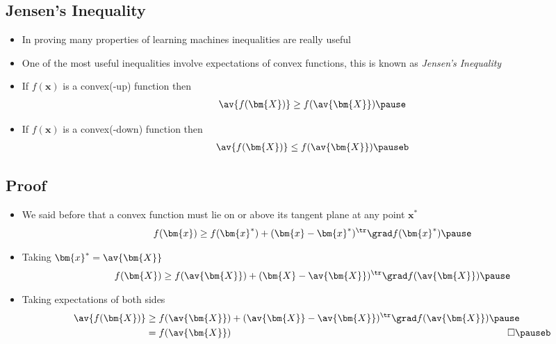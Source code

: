 \begin{slide}
\section{Jensen's Inequality}

\begin{PauseHighLight}
  \begin{itemize}
  \item In proving many properties of learning machines inequalities
    are really useful\pause
  \item One of the most useful inequalities involve expectations of
    convex functions, this is known as \emph{Jensen's
      Inequality}\pause
  \item If $f(\bm{x})$ is a convex(-up) function then
    \begin{align*}
      \av{f(\bm{X})} \geq f(\av{\bm{X}})\pause
    \end{align*}
  \item If $f(\bm{x})$ is a convex(-down) function then
    \begin{align*}
      \av{f(\bm{X})} \leq f(\av{\bm{X}})\pauseb
    \end{align*}
  \end{itemize}
\end{PauseHighLight}

\end{slide}


\begin{slide}
\section{Proof}

\begin{PauseHighLight}
  \begin{itemize}
  \item We said before that a convex function must lie on or above its
    tangent plane at any point $\bm{x}^*$
    \begin{align*}
      f(\bm{x}) \geq f(\bm{x}^*) + (\bm{x}-\bm{x}^*)^\tr \grad f(\bm{x}^*)\pause
    \end{align*}
  \item Taking $\bm{x}^*=\av{\bm{X}}$
    \begin{align*}
      f(\bm{X}) \geq f(\av{\bm{X}}) + (\bm{X}-\av{\bm{X}})^\tr \grad f(\av{\bm{X}})\pause
    \end{align*}
  \item Taking expectations of both sides
    \begin{align*}
      \av{f(\bm{X})}
      &\geq f(\av{\bm{X}}) +
      (\av{\bm{X}}-\av{\bm{X}})^\tr \grad f(\av{\bm{X}})\pause\\
      &= f(\av{\bm{X}}) \hspace{10cm} \square\pauseb
    \end{align*}
  \end{itemize}
\end{PauseHighLight}

\end{slide}

